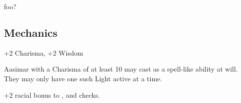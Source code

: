 
foo?

\subsection{Mechanics}

\begin{itemize*}
\item {}
\item {}
\item {}
\item {}
\item +2 Charisma, +2 Wisdom
\item Aasimar with a Charisma of at least 10 may cast  as a spell-like ability at will. They may only have one such Light active at a time.
\item +2 racial bonus to , and  checks.
\item {}
\item {}
\item {}
\end{itemize*}
